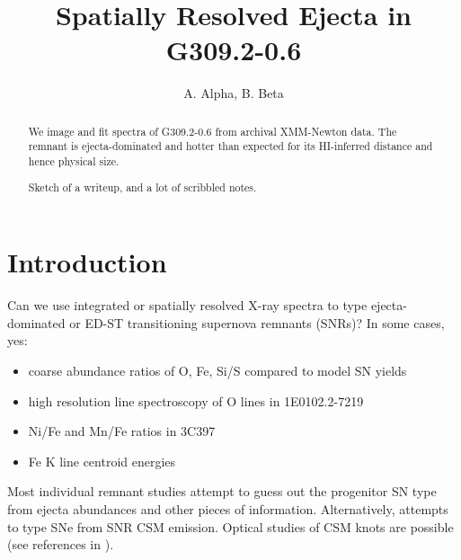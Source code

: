 \documentclass[preprint2,tighten,trackchanges]{aastex6}
\newcommand*{\tsup}{\textsuperscript}
\begin{document}
\title{Spatially Resolved Ejecta in G309.2-0.6}

\author{
A. Alpha, B. Beta%
}




\begin{abstract}
We image and fit spectra of G309.2-0.6 from archival XMM-Newton data.
The remnant is ejecta-dominated and hotter than expected for its HI-inferred
distance and hence physical size.

Sketch of a writeup, and a lot of scribbled notes.
\end{abstract}


\section{Introduction} \label{sec:intro}

Can we use integrated or spatially resolved X-ray spectra to type
ejecta-dominated or ED-ST transitioning supernova remnants (SNRs)?
In some cases, yes:
\begin{itemize}
    \item coarse abundance ratios of O, Fe, Si/S compared to model SN yields \citep{hughes1995}  %
    \item high resolution line spectroscopy of O lines in 1E0102.2-7219 \citep{flanagan2004}  %
    \item Ni/Fe and Mn/Fe ratios in 3C397 \citep{yamaguchi2015}
    \item Fe K line centroid energies \citep{yamaguchi2014, patnaude2015}
\end{itemize}
Most individual remnant studies attempt to guess out the progenitor SN type
from ejecta abundances and other pieces of information.
Alternatively, \citet{chevalier2005} attempts to type SNe from SNR CSM
emission.
Optical studies of CSM knots are possible (see references in
\citet{katsuda2015}).
\end{document}
